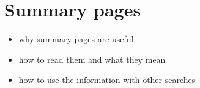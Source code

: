 \section{Summary pages}

\begin{itemize}
    \item why summary pages are useful 
    \item how to read them and what they mean
    \item how to use the information with other searches
\end{itemize}
